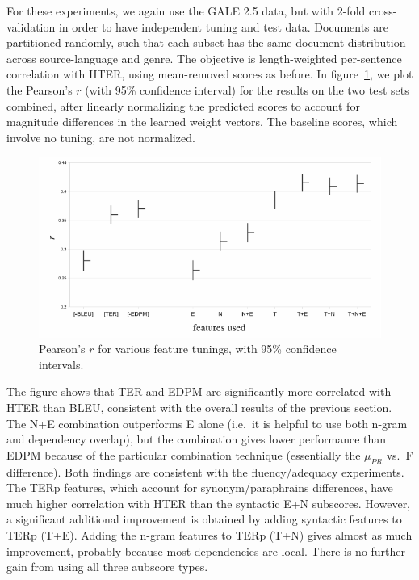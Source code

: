 \documentclass{kluwer}    %
\begin{document}
\begin{article}
For these experiments, we again use the GALE 2.5 data, but with 2-fold
cross-validation in order to have independent tuning and test data.
Documents are partitioned randomly, such that each subset has the same
document distribution across source-language and genre. The objective
is length-weighted per-sentence correlation with HTER, using
mean-removed scores as before. In figure~\ref{fig:tuneresults}, we
plot the Pearson's $r$ (with 95\% confidence interval) for the results
on the two test sets combined, after linearly normalizing the
predicted scores to account for magnitude differences in the learned
weight vectors.  The baseline scores, which involve no tuning, are not
normalized.

\begin{figure}
  \begin{center}
    \includegraphics[scale=0.45]{tuning}
  \end{center}
  \caption{Pearson's $r$ for various feature tunings, with 95\%
    confidence intervals.}
  \label{fig:tuneresults}
\end{figure}

The figure shows that TER and EDPM are significantly more correlated with HTER than BLEU, consistent with the overall results of the previous section. The N+E combination outperforms E alone (i.e.\ it is helpful to use both n-gram and dependency overlap), but the combination gives lower performance than EDPM because of the particular combination technique (essentially the $\mu_{PR}$ vs.\ F difference). Both findings are consistent with the fluency/adequacy experiments. The TERp features, which account for synonym/paraphrains differences, have much higher correlation with HTER than the syntactic E+N subscores.  However, a significant additional improvement is obtained by adding syntactic features to TERp (T+E). Adding the n-gram features to TERp (T+N) gives almost as much improvement, probably because most dependencies are local.  There is no further gain from using all three aubscore types.


\end{article}
\end{document}
